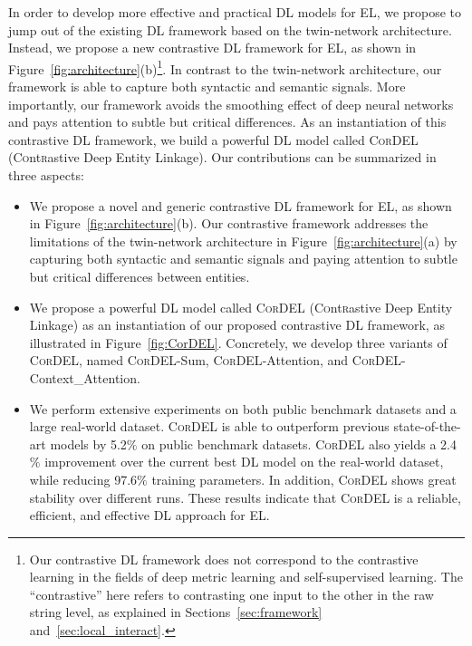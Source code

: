 \documentclass[conference]{IEEEtran}
\begin{document}
In order to develop more effective and practical DL models for EL, we propose to jump out of the existing DL framework based on the twin-network architecture. Instead, we propose a new contrastive DL framework for EL, as shown in Figure~\ref{fig:architecture}(b)\footnote{Our contrastive DL framework does not correspond to the contrastive learning in the fields of deep metric learning and self-supervised learning. The ``contrastive'' here refers to contrasting one input to the other in the raw string level, as explained in Sections~\ref{sec:framework} and~\ref{sec:local_interact}.}. In contrast to the twin-network architecture, our framework is able to capture both syntactic and semantic signals. More importantly, our framework avoids the smoothing effect of deep neural networks and pays attention to subtle but critical differences. As an instantiation of this contrastive DL framework, we build a powerful DL model called \textsc{CorDEL} (C\textsc{o}nt\textsc{r}astive Deep Entity Linkage). Our contributions can be summarized in three aspects:
\begin{itemize}
    \item We propose a novel and generic contrastive DL framework for EL, as shown in Figure~\ref{fig:architecture}(b). Our contrastive framework addresses the limitations of the twin-network architecture in Figure~\ref{fig:architecture}(a) by capturing both syntactic and semantic signals and paying attention to subtle but critical differences between entities.
    \item We propose a powerful DL model called \textsc{CorDEL} (C\textsc{o}nt\textsc{r}astive Deep Entity Linkage) as an instantiation of our proposed contrastive DL framework, as illustrated in Figure~\ref{fig:CorDEL}. Concretely, we develop three variants of \textsc{CorDEL}, named \textsc{CorDEL}-Sum, \textsc{CorDEL}-Attention, and \textsc{CorDEL}-Context\_Attention.
    \item We perform extensive experiments on both public benchmark datasets and a large real-world dataset. \textsc{CorDEL} is able to outperform previous state-of-the-art models by 5.2$\%$ on public benchmark datasets. \textsc{CorDEL} also yields a 2.4$\%$ improvement over the current best DL model on the real-world dataset, while reducing 97.6$\%$ training parameters. In addition, \textsc{CorDEL} shows great stability over different runs. These results indicate that \textsc{CorDEL} is a reliable, efficient, and effective DL approach for EL.
\end{itemize}
\end{document}
